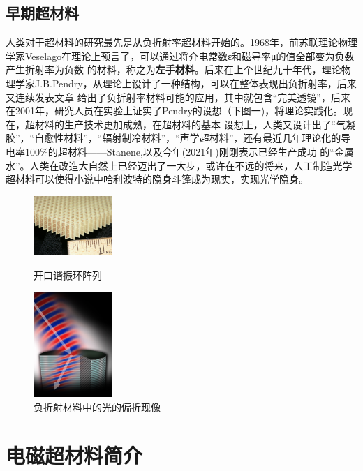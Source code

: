 \documentclass[UTF8]{ctexart}
\begin{document}
\subsection{早期超材料}
人类对于超材料的研究最先是从负折射率超材料开始的。1968年，前苏联理论物理学家Veselago在理论上预言了，可以通过将介电常数ε和磁导率μ的值全部变为负数产生折射率为负数
的材料，称之为\textbf{左手材料}\cite{RN7}。后来在上个世纪九十年代，理论物理学家J.B.Pendry，从理论上设计了一种结构，可以在整体表现出负折射率\cite{RN19}\cite{RN21}\cite{RN22}，后来又连续发表文章
给出了负折射率材料可能的应用，其中就包含“完美透镜”\cite{lens}，后来在2001年，研究人员在实验上证实了Pendry的设想（下图一)，将理论实践化\cite{RN24}。现在，超材料的生产技术更加成熟，在超材料的基本
设想上，人类又设计出了“气凝胶”\cite{RN12}，“自愈性材料\cite{wiki2}”，“辐射制冷材料”，“声学超材料\cite{RN2}”，还有最近几年理论化的导电率100\%的超材料——Stanene\cite{RN9}\cite{wiki3},以及今年(2021年)刚刚表示已经生产成功
的“金属水”\cite{RN13}。人类在改造大自然上已经迈出了一大步，或许在不远的将来，人工制造光学超材料可以使得小说中哈利波特的隐身斗篷成为现实，实现光学隐身。

\begin{figure}[htbp]
\begin{minipage}[t]{0.5\linewidth}
\centering
\includegraphics[width=3cm]{fig1.jpg}
\caption{开口谐振环阵列}
\label{fig-1}    
\end{minipage}
\hspace{1ex}
\begin{minipage}[t]{0.5\linewidth}
\centering
\includegraphics[width=3cm]{fig2.jpg}
\caption{负折射材料中的光的偏折现像}
\label{fig-2}    
\end{minipage}
\end{figure}

\section{电磁超材料简介}
\end{document}
